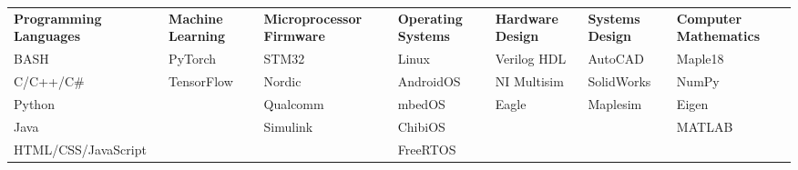 
\begin{cvparagraph}

\begin{center}
  \begin{tabular}{L L L L L L L}
  \textbf{Programming Languages} & \textbf{Machine Learning} & \textbf{Microprocessor Firmware} & \textbf{Operating Systems} & \textbf{Hardware Design} & \textbf{Systems Design} & \textbf{Computer Mathematics} \\
  BASH                 & PyTorch    & STM32    & Linux     & Verilog HDL & AutoCAD    & Maple18 \\
  C/C++/C\#            & TensorFlow & Nordic   & AndroidOS & NI Multisim & SolidWorks & NumPy   \\
  Python               &            & Qualcomm & mbedOS    & Eagle       & Maplesim   & Eigen   \\
  Java                 &            & Simulink & ChibiOS   &             &            & MATLAB  \\
  HTML/CSS/JavaScript  &            &          & FreeRTOS  &             &            &         \\
  \end{tabular}
\end{center}
\end{cvparagraph}

